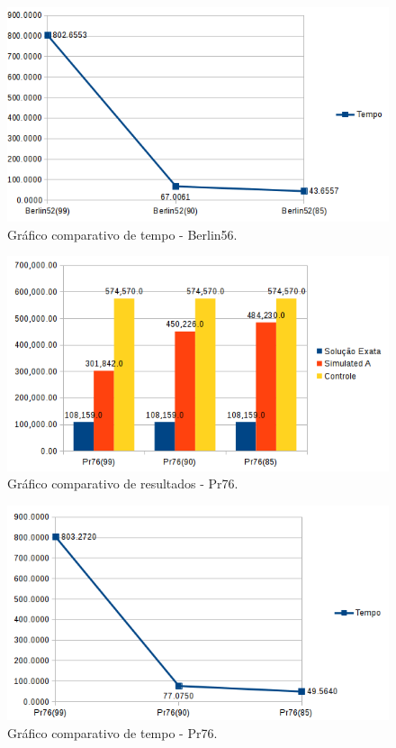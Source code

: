 \documentclass[a4paper, 12pt]{article}
\begin{document}
\begin{figure}[H]
	\centering
	\includegraphics[scale=0.8]{figures/graph4.png}
	\caption{Gráfico comparativo de tempo - Berlin56.}
	\label{fig:graph2}
\end{figure}

\begin{figure}[H]%
	\centering
	\includegraphics[scale=0.8]{figures/graph1.png}
	\caption{Gráfico comparativo de resultados - Pr76.}
	\label{fig:graph3}
\end{figure}

\begin{figure}[H]
	\centering
	\includegraphics[scale=0.8]{figures/graph2.png}
	\caption{Gráfico comparativo de tempo - Pr76.}
	\label{fig:graph4}
\end{figure}
\end{document}

